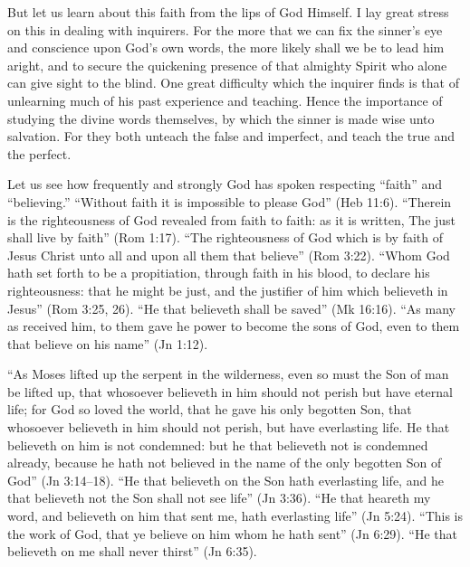 \documentclass[
]{book}
\begin{document}
But let us learn about this faith from the lips of God Himself. I lay great stress on this in dealing with inquirers. For the more that we can fix the sinner's eye and conscience upon God's own words, the more likely shall we be to lead him aright, and to secure the quickening presence of that almighty Spirit who alone can give sight to the blind. One great difficulty which the inquirer finds is that of unlearning much of his past experience and teaching. Hence the importance of studying the divine words themselves, by which the sinner is made wise unto salvation. For they both unteach the false and imperfect, and teach the true and the perfect.

Let us see how frequently and strongly God has spoken respecting ``faith'' and ``believing.'' ``Without faith it is impossible to please God'' (Heb 11:6). ``Therein is the righteousness of God revealed from faith to faith: as it is written, The just shall live by faith'' (Rom 1:17). ``The righteousness of God which is by faith of Jesus Christ unto all and upon all them that believe'' (Rom 3:22). ``Whom God hath set forth to be a propitiation, through faith in his blood, to declare his righteousness: that he might be just, and the justifier of him which believeth in Jesus'' (Rom 3:25, 26). ``He that believeth shall be saved'' (Mk 16:16). ``As many as received him, to them gave he power to become the sons of God, even to them that believe on his name'' (Jn 1:12).

``As Moses lifted up the serpent in the wilderness, even so must the Son of man be lifted up, that whosoever believeth in him should not perish but have eternal life; for God so loved the world, that he gave his only begotten Son, that whosoever believeth in him should not perish, but have everlasting life. He that believeth on him is not condemned: but he that believeth not is condemned already, because he hath not believed in the name of the only begotten Son of God'' (Jn 3:14--18). ``He that believeth on the Son hath everlasting life, and he that believeth not the Son shall not see life'' (Jn 3:36). ``He that heareth my word, and believeth on him that sent me, hath everlasting life'' (Jn 5:24). ``This is the work of God, that ye believe on him whom he hath sent'' (Jn 6:29). ``He that believeth on me shall never thirst'' (Jn 6:35).
\end{document}
